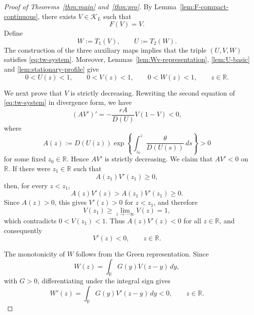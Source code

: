 \documentclass[preprint,sort&compress,final,12pt]{elsarticle}
\numberwithin{equation}{section}
\begin{document}
\begin{proof}[Proof of Theorems~\ref{thm:main} and~\ref{thm:pro}]
By Lemma~\ref{lem:F-compact-continuous}, there exists $V\in\mathcal K_L$ such that
\begin{equation*}
F(V)=V.
\end{equation*}
Define
\begin{equation*}
W:=T_1(V),\qquad U:=T_2(W).
\end{equation*}
The construction of the three auxiliary maps implies that the triple $(U,V,W)$ satisfies \eqref{eq:tw-system}. Moreover, Lemmas~\ref{lem:Wv-representation}, \ref{lem:U-basic} and \ref{lem:stationary-profile} give
\begin{equation*}
0<U(z)<1,\qquad 0<V(z)<1,\qquad 0<W(z)<1,
\qquad z\in\mathbb R.
\end{equation*}

We next prove that $V$ is strictly decreasing. Rewriting the second equation of \eqref{eq:tw-system} in divergence form, we have
\begin{equation*}
(AV')'=-\frac{rA}{D(U)}V(1-V)<0,
\end{equation*}
where
\begin{equation*}
A(z):=D(U(z))\exp\left\{\int_{z_0}^{z}\frac{\theta}{D(U(s))}\,ds\right\}>0
\end{equation*}
for some fixed $z_0\in\mathbb R$. Hence $AV'$ is strictly decreasing. We claim that $AV'<0$ on $\mathbb R$. If there were $z_1\in\mathbb R$ such that
\begin{equation*}
A(z_1)V'(z_1)\ge0,
\end{equation*}
then, for every $z<z_1$,
\begin{equation*}
A(z)V'(z)>A(z_1)V'(z_1)\ge0.
\end{equation*}
Since $A(z)>0$, this gives $V'(z)>0$ for $z<z_1$, and therefore
\begin{equation*}
V(z_1)\ge \lim_{z\to-\infty}V(z)=1,
\end{equation*}
which contradicts $0<V(z_1)<1$. Thus $A(z)V'(z)<0$ for all $z\in\mathbb R$, and consequently
\begin{equation*}
V'(z)<0,\qquad z\in\mathbb R.
\end{equation*}

The monotonicity of $W$ follows from the Green representation. Since
\begin{equation*}
W(z)=\int_{\mathbb R}G(y)V(z-y)\,dy,
\end{equation*}
with $G>0$, differentiating under the integral sign gives
\begin{equation*}
W'(z)=\int_{\mathbb R}G(y)V'(z-y)\,dy<0,
\qquad z\in\mathbb R.
\end{equation*}


\end{proof}
\end{document}
